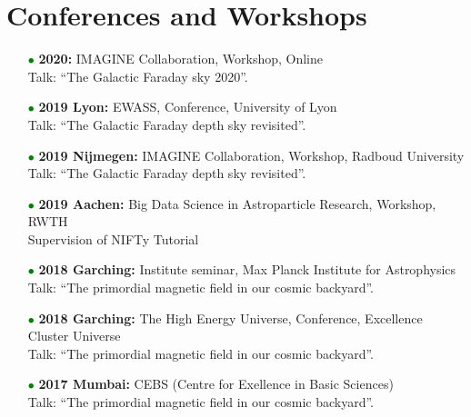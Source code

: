 \documentclass[11pt,a4paper,sans, table, dvipsnames]{moderncv}        %
\begin{document}
\section{Conferences and Workshops}
\begin{itemize}

\item[\textcolor{Green}{$\bullet$}]{\textbf{2020:} IMAGINE Collaboration, Workshop, Online\\ Talk: ``The Galactic Faraday sky 2020''.}

\item[\textcolor{Green}{$\bullet$}]{\textbf{2019 Lyon:} EWASS, Conference, University of Lyon \\ Talk: ``The Galactic Faraday depth sky revisited''.}

\vspace{5pt}

\item[\textcolor{Green}{$\bullet$}]{\textbf{2019 Nijmegen:} IMAGINE Collaboration, Workshop, Radboud University\\ Talk: ``The Galactic Faraday depth sky revisited''.}

\vspace{5pt}

\item[\textcolor{Green}{$\bullet$}]{\textbf{2019 Aachen:} Big Data Science in Astroparticle Research, Workshop, RWTH \\ Supervision of NIFTy Tutorial}

\vspace{5pt}

\item[\textcolor{Green}{$\bullet$}]{\textbf{2018 Garching:} Institute seminar, Max Planck Institute for Astrophysics\\ Talk: ``The primordial magnetic field in our cosmic backyard''.}

\vspace{5pt}

\item[\textcolor{Green}{$\bullet$}]{\textbf{2018 Garching:} The High Energy Universe, Conference, Excellence Cluster Universe \\ Talk: ``The primordial magnetic field in our cosmic backyard''.}

\vspace{5pt}

\item[\textcolor{Green}{$\bullet$}]{\textbf{2017 Mumbai:} CEBS (Centre for Exellence in Basic
Sciences) \\ Talk: ``The primordial magnetic field in our cosmic backyard''.}


\end{itemize}
\end{document}
